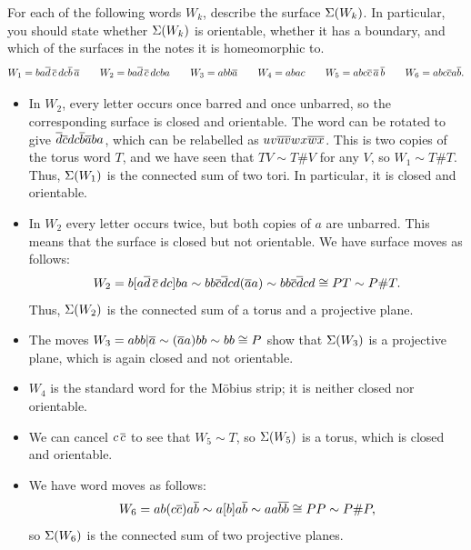 \documentclass[a4paper]{amsart}
\begin{document}
\begin{exercise}
 For each of the following words $W_k$, describe the surface
 $\Sigma(W_k)$.  In particular, you should state whether $\Sigma(W_k)$ is
 orientable, whether it has a boundary, and which of the surfaces in
 the notes it is homeomorphic to.
 \[ W_1 = ba\overline{d}\,\overline{c}\,dc\overline{b}\,\overline{a} \qquad
    W_2 = ba\overline{d}\,\overline{c}\,dcba \qquad
    W_3 = abb\overline{a} \qquad
    W_4 = abac \qquad
    W_5 = abc\overline{c}\,\overline{a}\,\overline{b} \qquad
    W_6 = abc\overline{c} a\overline{b}.
 \]
\end{exercise}
\begin{solution}
 \begin{itemize}
  \item In $W_2$, every letter occurs once barred and once unbarred,
   so the corresponding surface is closed and orientable.  The word
   can be rotated to give $\overline{d}\overline{c} dc\overline{b}\overline{a} ba$, which
   can be relabelled as $uv\overline{u}\overline{v} wx\overline{w}\overline{x}$.  This is two copies of the
   torus word $T$, and we have seen that $TV\sim T\#V$ for any $V$, so
   $W_1\sim T\# T$.  Thus, $\Sigma(W_1)$ is the connected sum of two
   tori.  In particular, it is closed and orientable.
  \item In $W_2$ every letter occurs twice, but both copies of $a$ are
   unbarred.  This means that the surface is closed but not
   orientable.  We have surface moves as follows:
   \[ W_2 = b[a\overline{d}\,\overline{c}\,dc]ba 
          \sim bb\overline{c}\overline{d} cd(\overline{a} a)
          \sim bb\overline{c}\overline{d} cd 
          \cong PT \sim P\# T.
   \]
   Thus, $\Sigma(W_2)$ is the connected sum of a torus and a projective
   plane.
  \item The moves $W_3=abb|\overline{a}\sim (\overline{a} a)bb\sim bb\cong P$ show that
   $\Sigma(W_3)$ is a projective plane, which is again closed and not
   orientable.
  \item $W_4$ is the standard word for the M\"obius strip; it is
   neither closed nor orientable.
  \item We can cancel $c\,\overline{c}$ to see that $W_5\sim T$, so $\Sigma(W_5)$
   is a torus, which is closed and orientable.
  \item We have word moves as follows:
   \[ W_6 = ab(c\overline{c})a\overline{b} \sim a[b]a\overline{b} \sim aa\overline{b}\overline{b} \cong PP
       \sim P\# P,
   \]
   so $\Sigma(W_6)$ is the connected sum of two projective planes.
 \end{itemize}
\end{solution}
\end{document}

